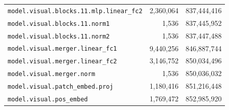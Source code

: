 \documentclass[10pt,a4paper]{article}
\theoremstyle{definition}
\begin{document}
\begin{appendices}
\begin{longtable}{p{9.5cm}rr}
\texttt{model.\allowbreak{}visual.\allowbreak{}blocks.\allowbreak{}11.\allowbreak{}mlp.\allowbreak{}linear\_fc2} & 2,360,064 & 837,444,416 \\
\texttt{model.\allowbreak{}visual.\allowbreak{}blocks.\allowbreak{}11.\allowbreak{}norm1} & 1,536 & 837,445,952 \\
\texttt{model.\allowbreak{}visual.\allowbreak{}blocks.\allowbreak{}11.\allowbreak{}norm2} & 1,536 & 837,447,488 \\
\texttt{model.\allowbreak{}visual.\allowbreak{}merger.\allowbreak{}linear\_fc1} & 9,440,256 & 846,887,744 \\
\texttt{model.\allowbreak{}visual.\allowbreak{}merger.\allowbreak{}linear\_fc2} & 3,146,752 & 850,034,496 \\
\texttt{model.\allowbreak{}visual.\allowbreak{}merger.\allowbreak{}norm} & 1,536 & 850,036,032 \\
\texttt{model.\allowbreak{}visual.\allowbreak{}patch\_embed.\allowbreak{}proj} & 1,180,416 & 851,216,448 \\
\texttt{model.\allowbreak{}visual.\allowbreak{}pos\_embed} & 1,769,472 & 852,985,920 \\
\end{longtable}
\end{appendices}
\end{document}
